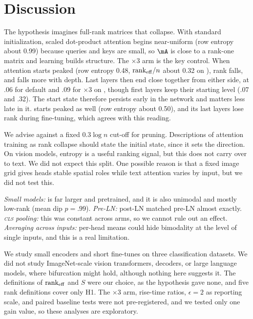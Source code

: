 \section{Discussion}
\label{sec:discussion}

 The hypothesis imagines full-rank matrices that collapse. With standard initialization, scaled dot-product attention begins near-uniform (row entropy about 0.99) because queries and keys are small, so $\mA$ is close to a rank-one matrix and learning builds structure. The $\times3$ arm is the key control. When attention starts peaked (row entropy 0.48, $\mathrm{rank}_{\mathrm{eff}}/n$ about 0.32 on \agnews), rank falls, and falls more with depth. Last layers then end close together from either side, at .06 for default and .09 for $\times3$ on \agnews, though first layers keep their starting level (.07 and .32). The start state therefore persists early in the network and matters less late in it. \bert starts peaked as well (row entropy about 0.50), and its last layers lose rank during fine-tuning, which agrees with this reading.

 We advise against a fixed $0.3\log n$ cut-off for pruning. Descriptions of attention training as rank collapse should state the initial state, since it sets the direction. On vision models, entropy is a useful ranking signal, but this does not carry over to text. We did not expect this split. One possible reason is that a fixed image grid gives heads stable spatial roles while text attention varies by input, but we did not test this.

 {\it Small models:} \bert is far larger and pretrained, and it is also unimodal and mostly low-rank (mean dip $p=.99$). {\it Pre-LN:} post-LN matched pre-LN almost exactly. {\it \textsc{cls} pooling:} this was constant across arms, so we cannot rule out an effect. {\it Averaging across inputs:} per-head means could hide bimodality at the level of single inputs, and this is a real limitation.

 We study small encoders and short fine-tunes on three classification datasets. We did not study ImageNet-scale vision transformers, decoders, or large language models, where bifurcation might hold, although nothing here suggests it. The definitions of $\mathrm{rank}_{\mathrm{eff}}$ and $S$ were our choice, as the hypothesis gave none, and five rank definitions cover only H1. The $\times3$ arm, rise-time ratios, $\epsilon=2$ as reporting scale, and paired baseline tests were not pre-registered, and we tested only one gain value, so these analyses are exploratory.

